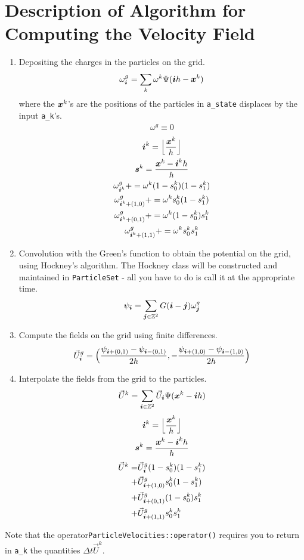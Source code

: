 \documentclass[11pt]{article}
\begin{document}
\section*{Description of Algorithm for Computing the Velocity Field}
\begin{enumerate}
\item Depositing the charges in the particles on the grid.
\begin{gather*}
\omega^g_{\boldsymbol{i}} = \sum \limits_k \omega^k \Psi({\boldsymbol{i}} h - {\boldsymbol{x}}^k)
\end{gather*}
where the ${\boldsymbol{x}}^k$'s are the positions of the particles in {\tt a\_state} displaces by the input {\tt a\_k}'s.
\begin{gather*}
\omega^g \equiv 0
\end{gather*}
\begin{gather*}
{\boldsymbol{i}}^k = \Big \lfloor \frac{{\boldsymbol{x}}^k}{h} \Big \rfloor \\
{\boldsymbol{s}}^k =\frac{{\boldsymbol{x}}^k - {\boldsymbol{i}}^k h}{h}\\
\omega^g_{{\boldsymbol{i}}^k} += \omega^k (1 - s^k_0)(1-s^k_1) \\
\omega^g_{{\boldsymbol{i}}^k + (1,0)} += \omega^k s^k_0 (1 - s^k_1) \\
\omega^g_{{\boldsymbol{i}}^k + (0,1)} += \omega^k (1 - s^k_0) s^k_1 \\
\omega^g_{{\boldsymbol{i}}^k + (1,1)} += \omega^k s^k_0 s^k_1 
\end{gather*}
\item Convolution with the Green's function to obtain the potential on the grid, using Hockney's algorithm. The Hockney class will be constructed and maintained in {\tt ParticleSet} - all you have to do is call it at the appropriate time.
\begin{gather*}
\psi_{\boldsymbol{i}} = \sum \limits_{{\boldsymbol{j}} \in \mathbb{Z}^2} G({\boldsymbol{i}} - {\boldsymbol{j}}) \omega^g_{\boldsymbol{j}}
\end{gather*}
\item Compute the fields on the grid using finite differences.
\begin{gather*}
\vec{U}^g_{\boldsymbol{i}} = \Big (\frac{\psi_{{\boldsymbol{i}} + (0,1)} - \psi_{{\boldsymbol{i}} - (0,1)}}{2 h} , -\frac{\psi_{{\boldsymbol{i}} + (1,0)} - \psi_{{\boldsymbol{i}} - (1,0)}}{2 h} \Big )
\end{gather*}
\item Interpolate the fields from the grid to the particles.  
\begin{gather*}
\vec{U}^k = \sum \limits_{{\boldsymbol{i}} \in \mathbb{Z}^2} \vec{U}_{\boldsymbol{i}} \Psi({\boldsymbol{x}}^k - {\boldsymbol{i}} h)
\end{gather*}
\begin{gather*}
{\boldsymbol{i}}^k = \Big \lfloor \frac{{\boldsymbol{x}}^k}{h} \Big \rfloor \\
{\boldsymbol{s}}^k =\frac{{\boldsymbol{x}}^k - {\boldsymbol{i}}^k h}{h}
\end{gather*}
\begin{align*}
\vec{U}^k = & \vec{U}^g_{\boldsymbol{i}} (1 - s^k_0)(1-s^k_1) \\
+ & \vec{U}^g_{{\boldsymbol{i}} + (1,0)} s^k_0 (1 - s^k_1) \\
+ & \vec{U}^g_{{\boldsymbol{i}} + (0,1)}(1 - s^k_0) s^k_1 \\
+ & \vec{U}^g_{{\boldsymbol{i}} + (1,1)} s^k_0 s^k_1 
\end{align*}
\end{enumerate}
Note that the operator{\tt ParticleVelocities::operator()} requires you to return in {\tt a\_k} the quantities $\Delta t  \vec{U}^k$.
\end{document}
